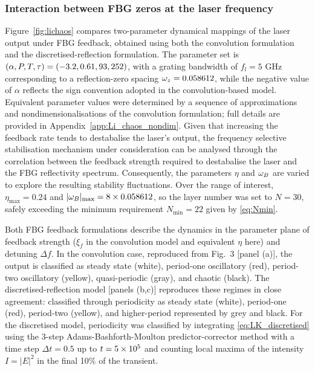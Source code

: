 \subsubsection{Interaction between FBG zeros at the laser frequency}
\label{subsubsec:lichaos}
%
Figure~\ref{fig:lichaos} compares two-parameter dynamical mappings of the laser output under FBG feedback, obtained using both the convolution formulation \cite{li2012distributed,li2015chaotic,li2020stable} and the discretised-reflection formulation. 
The parameter set is $(\alpha, P, T, \tau) = (-3.2, 0.61, 93, 252)$, with a grating bandwidth of $f_l = 5$ GHz corresponding to a reflection-zero spacing $\omega_z = 0.058612$, while the negative value of $\alpha$ reflects the sign convention adopted in the convolution-based model.
Equivalent parameter values were determined by a sequence of approximations and nondimensionalisations of the convolution formulation; full details are provided in Appendix~\ref{app:Li_chaos_nondim}.
Given that increasing the feedback rate tends to destabalise the laser's output, the frequency selective stabilisation mechanism under consideration can be analysed through the correlation between the feedback strength required to destabalise the laser and the FBG reflectivity spectrum.
Consequently, the parameters $\eta$ and $\omega_B$ are varied to explore the resulting stability fluctuations.
Over the range of interest, $\eta_\text{max} = 0.24$ and $|\omega_B|_\text{max} = 8 \times 0.058612$, so the layer number was set to $N=30$, safely exceeding the minimum requirement $N_\text{min}=22$ given by \eqref{eq:Nmin}.
%
\par
%
Both FBG feedback formulations describe the dynamics in the parameter plane of feedback strength ($\xi_f$ in the convolution model and equivalent $\eta$ here) and detuning $\Delta f$. 
In the convolution case, reproduced from \cite{li2015chaotic} Fig.~3 [panel (a)], the output is classified as steady state (white), period-one oscillatory (red), period-two oscillatory (yellow), quasi-periodic (gray), and chaotic (black). 
The discretised-reflection model [panels (b,c)] reproduces these regimes in close agreement: classified through periodicity as steady state (white), period-one (red), period-two (yellow), and higher-period represented by grey and black.
For the discretised model, periodicity was classified by integrating \eqref{eq:LK_discretised} using the 3-step  Adams-Bashforth-Moulton predictor-corrector method with a time step $\Delta t = 0.5$ up to $t = 5\times 10^{5}$ and counting local maxima of the intensity $I = |E|^2$ in the final 10\% of the transient.
